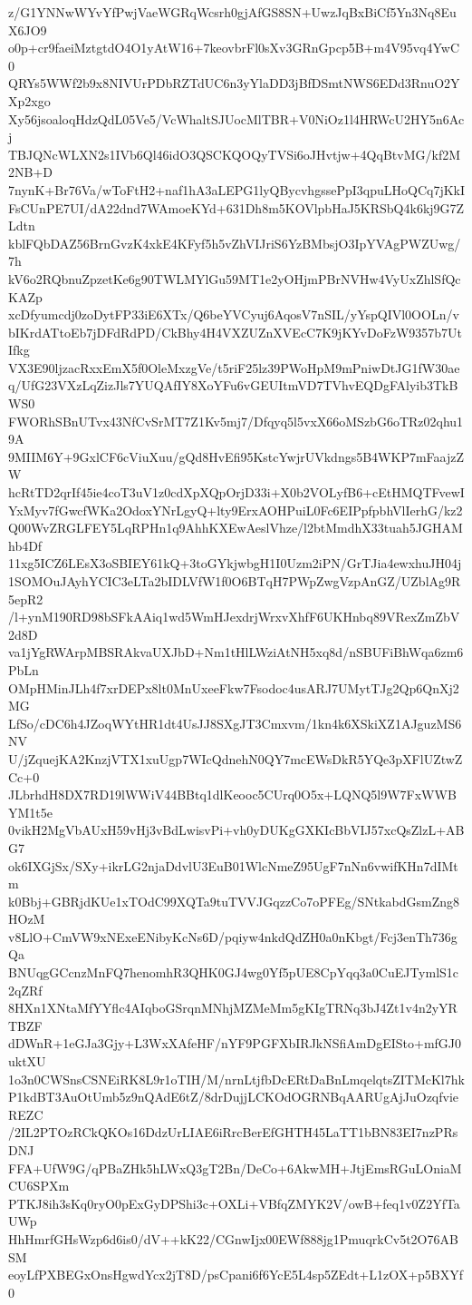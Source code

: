 z/G1YNNwWYvYfPwjVaeWGRqWcsrh0gjAfGS8SN+UwzJqBxBiCf5Yn3Nq8EuX6JO9
o0p+cr9faeiMztgtdO4O1yAtW16+7keovbrFl0sXv3GRnGpcp5B+m4V95vq4YwC0
QRYs5WWf2b9x8NIVUrPDbRZTdUC6n3yYlaDD3jBfDSmtNWS6EDd3RnuO2YXp2xgo
Xy56jsoaloqHdzQdL05Ve5/VcWhaltSJUocMlTBR+V0NiOz1l4HRWcU2HY5n6Acj
TBJQNcWLXN2s1IVb6Ql46idO3QSCKQOQyTVSi6oJHvtjw+4QqBtvMG/kf2M2NB+D
7nynK+Br76Va/wToFtH2+naf1hA3aLEPG1lyQBycvhgssePpI3qpuLHoQCq7jKkI
FsCUnPE7UI/dA22dnd7WAmoeKYd+631Dh8m5KOVlpbHaJ5KRSbQ4k6kj9G7ZLdtn
kblFQbDAZ56BrnGvzK4xkE4KFyf5h5vZhVIJriS6YzBMbsjO3IpYVAgPWZUwg/7h
kV6o2RQbnuZpzetKe6g90TWLMYlGu59MT1e2yOHjmPBrNVHw4VyUxZhlSfQcKAZp
xcDfyumcdj0zoDytFP33iE6XTx/Q6beYVCyuj6AqosV7nSIL/yYspQIVl0OOLn/v
bIKrdATtoEb7jDFdRdPD/CkBhy4H4VXZUZnXVEcC7K9jKYvDoFzW9357b7UtIfkg
VX3E90ljzacRxxEmX5f0OleMxzgVe/t5riF25lz39PWoHpM9mPniwDtJG1fW30ae
q/UfG23VXzLqZizJls7YUQAfIY8XoYFu6vGEUItmVD7TVhvEQDgFAlyib3TkBWS0
FWORhSBnUTvx43NfCvSrMT7Z1Kv5mj7/Dfqyq5l5vxX66oMSzbG6oTRz02qhu19A
9MIIM6Y+9GxlCF6cViuXuu/gQd8HvEfi95KstcYwjrUVkdngs5B4WKP7mFaajzZW
hcRtTD2qrIf45ie4coT3uV1z0cdXpXQpOrjD33i+X0b2VOLyfB6+cEtHMQTFvewI
YxMyv7fGwcfWKa2OdoxYNrLgyQ+lty9ErxAOHPuiL0Fc6EIPpfpbhVlIerhG/kz2
Q00WvZRGLFEY5LqRPHn1q9AhhKXEwAeslVhze/l2btMmdhX33tuah5JGHAMhb4Df
11xg5ICZ6LEsX3oSBIEY61kQ+3toGYkjwbgH1I0Uzm2iPN/GrTJia4ewxhuJH04j
1SOMOuJAyhYCIC3eLTa2bIDLVfW1f0O6BTqH7PWpZwgVzpAnGZ/UZblAg9R5epR2
/l+ynM190RD98bSFkAAiq1wd5WmHJexdrjWrxvXhfF6UKHnbq89VRexZmZbV2d8D
va1jYgRWArpMBSRAkvaUXJbD+Nm1tHlLWziAtNH5xq8d/nSBUFiBhWqa6zm6PbLn
OMpHMinJLh4f7xrDEPx8lt0MnUxeeFkw7Fsodoc4usARJ7UMytTJg2Qp6QnXj2MG
LfSo/cDC6h4JZoqWYtHR1dt4UsJJ8SXgJT3Cmxvm/1kn4k6XSkiXZ1AJguzMS6NV
U/jZquejKA2KnzjVTX1xuUgp7WIcQdnehN0QY7mcEWsDkR5YQe3pXFlUZtwZCc+0
JLbrhdH8DX7RD19lWWiV44BBtq1dlKeooc5CUrq0O5x+LQNQ5l9W7FxWWBYM1t5e
0vikH2MgVbAUxH59vHj3vBdLwisvPi+vh0yDUKgGXKIcBbVIJ57xcQsZlzL+ABG7
ok6IXGjSx/SXy+ikrLG2njaDdvlU3EuB01WlcNmeZ95UgF7nNn6vwifKHn7dIMtm
k0Bbj+GBRjdKUe1xTOdC99XQTa9tuTVVJGqzzCo7oPFEg/SNtkabdGsmZng8HOzM
v8LlO+CmVW9xNExeENibyKcNs6D/pqiyw4nkdQdZH0a0nKbgt/Fcj3enTh736gQa
BNUqgGCcnzMnFQ7henomhR3QHK0GJ4wg0Yf5pUE8CpYqq3a0CuEJTymlS1c2qZRf
8HXn1XNtaMfYYflc4AIqboGSrqnMNhjMZMeMm5gKIgTRNq3bJ4Zt1v4n2yYRTBZF
dDWnR+1eGJa3Gjy+L3WxXAfeHF/nYF9PGFXbIRJkNSfiAmDgEISto+mfGJ0uktXU
1o3n0CWSnsCSNEiRK8L9r1oTIH/M/nrnLtjfbDcERtDaBnLmqelqtsZITMcKl7hk
P1kdBT3AuOtUmb5z9nQAdE6tZ/8drDujjLCKOdOGRNBqAARUgAjJuOzqfvieREZC
/2IL2PTOzRCkQKOs16DdzUrLIAE6iRrcBerEfGHTH45LaTT1bBN83EI7nzPRsDNJ
FFA+UfW9G/qPBaZHk5hLWxQ3gT2Bn/DeCo+6AkwMH+JtjEmsRGuLOniaMCU6SPXm
PTKJ8ih3sKq0ryO0pExGyDPShi3c+OXLi+VBfqZMYK2V/owB+feq1v0Z2YfTaUWp
HhHmrfGHsWzp6d6is0/dV++kK22/CGnwIjx00EWf888jg1PmuqrkCv5t2O76ABSM
eoyLfPXBEGxOnsHgwdYcx2jT8D/psCpani6f6YcE5L4sp5ZEdt+L1zOX+p5BXYf0

